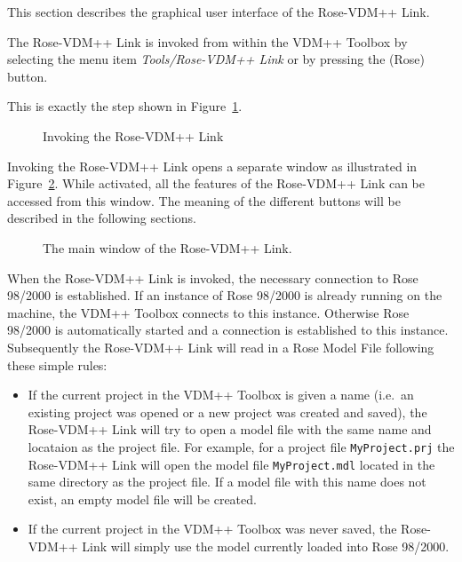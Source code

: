\documentclass[\pformat,12pt]{article}
\newcommand{\vdmpp}{VDM++}
\newcommand{\ToolboxName}{\vdmpp{} Toolbox}
\newcommand{\link}{Rose-\vdmpp{} Link}
\newcommand{\rose}{Rose 98/2000}
\newcommand{\guicmd}[1]{{\sf #1}}
\begin{document}
This section describes the graphical user interface of the \link{}.

The \link{} is invoked from within the \vdmpp{} Toolbox by selecting the menu   
item {\it Tools/\link{}} or by pressing the 
(\guicmd{Rose}) button.

This is exactly the step shown in
Figure~\ref{fig:toolbox}.

\begin{figure}[htb]
\begin{center}
\mbox{}
\caption{Invoking the \link{}\label{fig:toolbox}}
\end{center}
\end{figure}

Invoking the \link{} opens a separate window as illustrated in Figure~\ref{fig:userinterface}.
While activated, all the features of the \link{} can be accessed from this window.  
The meaning of the different buttons will be described in the following sections.

\begin{figure}[htb]
\begin{center}
\mbox{}
\caption{The main window of the \link{}.\label{fig:userinterface}}
\end{center}
\end{figure}

When the \link{} is invoked, the necessary connection to \rose{} is
established. If an instance of \rose{} is already running on the
machine, the \vdmpp{} Toolbox connects to this instance. Otherwise
\rose{} is automatically started and a connection is established to
this instance. Subsequently the \link{} will read in a Rose Model File
following these simple rules:
\begin{itemize}
\item If the current project in the \ToolboxName{} is given a name
  (i.e.\ an existing project was opened or a new project was created
  and saved), the \link{} will try to open a model file with the same
  name and locataion as the project file. For example, for a project
  file {\tt MyProject.prj} the \link{} will open the model file
  {\tt MyProject.mdl} located in the same directory as the project file.
  If a model file with this name does not exist, an empty model file
  will be created.
\item If the current project in the \ToolboxName{} was never saved,
  the \link{} will simply use the model currently loaded into
  \rose{}.
\end{itemize}
\end{document}
